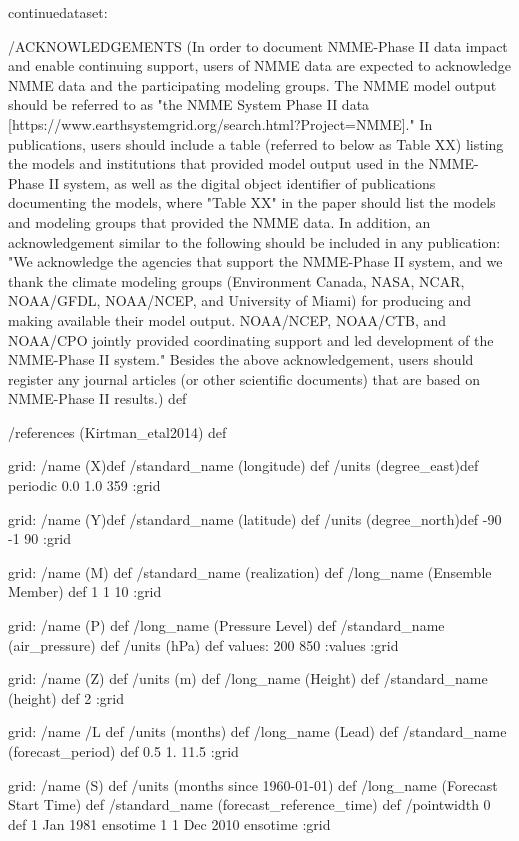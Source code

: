 \begin{ingrid}
continuedataset:

/ACKNOWLEDGEMENTS (In order to document NMME-Phase II data impact and enable continuing support, users of NMME data are expected to acknowledge NMME data and the participating modeling groups. The NMME model output should be referred to as "the NMME System Phase II data [https://www.earthsystemgrid.org/search.html?Project=NMME]."  In publications, users should include a table (referred to below as Table XX) listing the models and institutions that provided model output used in the NMME-Phase II system, as well as the digital object identifier of publications documenting the models, where "Table XX" in the paper should list the models and modeling groups that provided the NMME data.  In addition, an acknowledgement similar to the following should be included in any publication:  "We acknowledge the agencies that support the NMME-Phase II system, and we thank the climate modeling groups (Environment Canada, NASA, NCAR, NOAA/GFDL, NOAA/NCEP, and University of Miami) for producing and making available their model output. NOAA/NCEP, NOAA/CTB, and NOAA/CPO jointly provided coordinating support and led development of the NMME-Phase II system."  Besides the above acknowledgement, users should register any journal articles (or other scientific documents) that are based on NMME-Phase II results.) def

/references (Kirtman_etal2014) def

grid:
/name (X)def
/standard_name (longitude) def
/units (degree_east)def
periodic
 0.0 1.0 359
:grid

grid:
/name (Y)def
/standard_name (latitude) def
/units (degree_north)def
-90 -1 90
:grid

grid:
/name (M) def
/standard_name (realization) def
/long_name (Ensemble Member) def
1 1 10
:grid

grid:
/name (P) def
/long_name (Pressure Level) def
/standard_name (air_pressure) def
/units (hPa) def
values: 200 850 :values
:grid

grid:
/name (Z) def
/units (m) def
/long_name (Height) def
/standard_name (height) def
2 
:grid

grid:
/name /L def
/units (months) def
/long_name (Lead) def
/standard_name (forecast_period) def
0.5 1. 11.5
:grid

grid:
/name (S) def
/units (months since 1960-01-01) def
/long_name (Forecast Start Time) def
/standard_name (forecast_reference_time) def
/pointwidth 0 def
1 Jan 1981 ensotime
1
1 Dec 2010 ensotime
:grid


\end{ingrid}
